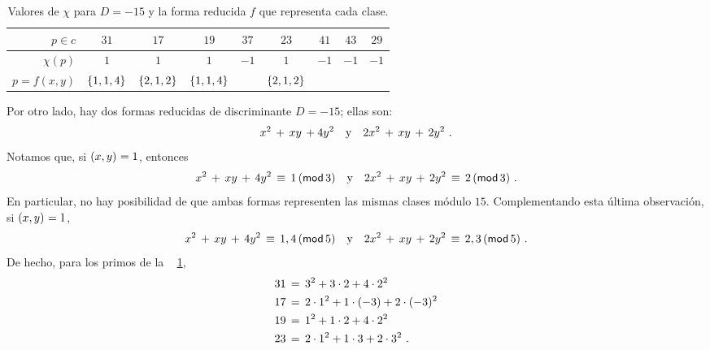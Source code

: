 \begin{ejemDirichlet}
\begin{table}
\begin{tabular}{r|cccccccc}
			\hline
			$p\in c$ & $31$ & $17$ & $19$ & $37$
				& $23$ & $41$ & $43$ & $29$ \\
			\hline
			$\chi(p)$ & $1$ & $1$ & $1$ & $-1$
				& $1$ & $-1$ & $-1$ & $-1$ \\
			\hline
			$p=f(x,y)$ & $\binaria{1,1,4}$ & $\binaria{2,1,2}$
				& $\binaria{1,1,4}$ &
				& $\binaria{2,1,2}$ & & &
		\end{tabular}
		\caption{
			Valores de $\chi$ para $D=-15$ y la forma
			reducida $f$ que representa cada clase.
		}\label{tab:ejem:dirichlet:representacion:quince}
	\end{table}
	Por otro lado, hay dos formas reducidas de discriminante $D=-15$;
	ellas son:
	\begin{displaymath}
		x^2\,+\,xy\,+4y^2
		\dispand
		2x^2\,+\,xy\,+\,2y^2
		\dispstop
	\end{displaymath}
	Notamos que, si $\mcd{x,y}=1$, entonces
	\begin{displaymath}
		x^2\,+\,xy\,+\,4y^2\,\equiv\,1\tmodulo[3]
		\dispand
		2x^2\,+\,xy\,+\,2y^2\,\equiv\,2\tmodulo[3]
		\dispstop
	\end{displaymath}
	En particular, no hay posibilidad de que ambas formas
	representen las mismas clases m\'odulo $15$.
	Complementando esta \'ultima observaci\'on,
	si $\mcd{x,y}=1$,
	\begin{displaymath}
		x^2\,+\,xy\,+\,4y^2\,\equiv\,1,4\tmodulo[5]
		\dispand
		2x^2\,+\,xy\,+\,2y^2\,\equiv\,2,3\tmodulo[5]
		\dispstop
	\end{displaymath}
	De hecho, para los primos de la \tablename~%
	\ref{tab:ejem:dirichlet:representacion:quince},
	\begin{displaymath}
		\begin{aligned}
			31 & \,=\, 3^2+3\cdot 2+4\cdot 2^2 \\
			17 & \,=\, 2\cdot 1^2+1\cdot (-3)+2\cdot (-3)^2 \\
			19 & \,=\, 1^2+1\cdot 2+4\cdot 2^2 \\
			23 & \,=\,2\cdot 1^2+1\cdot 3+2\cdot 3^2
			\dispstop
		\end{aligned}
	\end{displaymath}
\end{ejemDirichlet}

